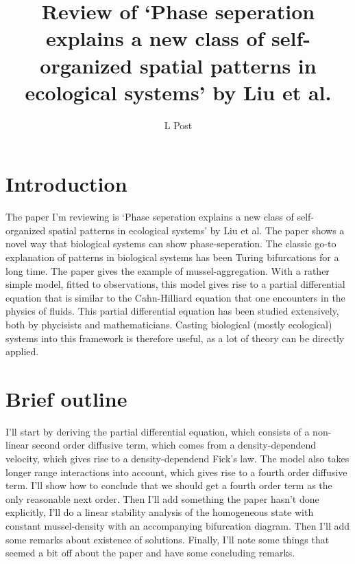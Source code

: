 \documentclass[a4paper]{jpconf}
\begin{document}
\nocite{*}
\title{Review of `Phase seperation explains a new class of
self-organized spatial patterns in ecological systems' by Liu et al.}

\author{L Post}

\address{MSc in Physics and Mathematics, University of Amsterdam, NL}



\section{Introduction}

The paper I'm reviewing is `Phase seperation explains a new class of self-organized spatial patterns in ecological systems' by Liu et al. The paper shows a novel way that biological systems can show phase-seperation. The classic go-to explanation of patterns in biological systems has been Turing bifurcations for a long time. The paper gives the example of mussel-aggregation. With a rather simple model, fitted to observations, this model gives rise to a partial differential equation that is similar to the Cahn-Hilliard equation that one encounters in the physics of fluids. This partial differential equation has been studied extensively, both by phycisists and mathematicians. Casting biological (mostly ecological) systems into this framework is therefore useful, as a lot of theory can be directly applied. 
\section{Brief outline}
I'll start by deriving the partial differential equation, which consists of a non-linear second order diffusive term, which comes from a density-dependend velocity, which gives rise to a density-dependend Fick's law. The model also takes longer range interactions into account, which gives rise to a fourth order diffusive term. I'll show how to conclude that we should get a fourth order term as the only reasonable next order. Then I'll add something the paper hasn't done explicitly, I'll do a linear stability analysis of the homogeneous state with constant mussel-density with an accompanying bifurcation diagram. Then I'll add some remarks about existence of solutions. Finally, I'll note some things that seemed a bit off about the paper and have some concluding remarks.
\end{document}
